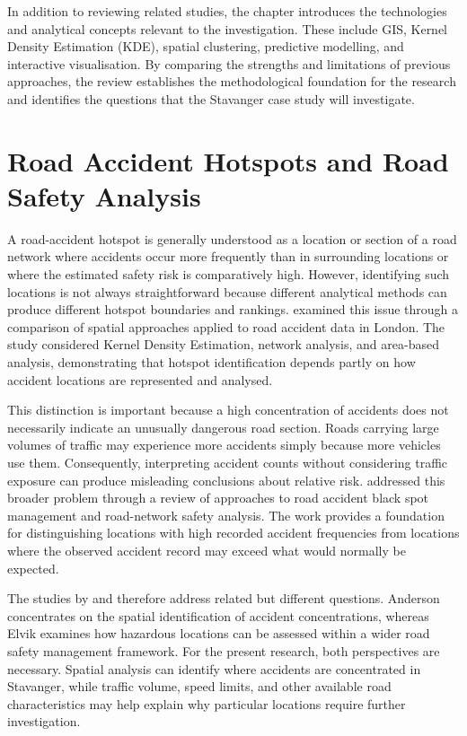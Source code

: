 In addition to reviewing related studies, the chapter introduces the technologies and analytical concepts relevant to the investigation. These include GIS, Kernel Density Estimation (KDE), spatial clustering, predictive modelling, and interactive visualisation. By comparing the strengths and limitations of previous approaches, the review establishes the methodological foundation for the research and identifies the questions that the Stavanger case study will investigate.

\section{Road Accident Hotspots and Road Safety Analysis}
\label{sec:lit-background}
A road-accident hotspot is generally understood as a location or section of a road network where accidents occur more frequently than in surrounding locations or where the estimated safety risk is comparatively high. However, identifying such locations is not always straightforward because different analytical methods can produce different hotspot boundaries and rankings. \textcite{Anderson2007} examined this issue through a comparison of spatial approaches applied to road accident data in London. The study considered Kernel Density Estimation, network analysis, and area-based analysis, demonstrating that hotspot identification depends partly on how accident locations are represented and analysed.

This distinction is important because a high concentration of accidents does not necessarily indicate an unusually dangerous road section. Roads carrying large volumes of traffic may experience more accidents simply because more vehicles use them. Consequently, interpreting accident counts without considering traffic exposure can produce misleading conclusions about relative risk. \textcite{Elvik2008} addressed this broader problem through a review of approaches to road accident black spot management and road-network safety analysis. The work provides a foundation for distinguishing locations with high recorded accident frequencies from locations where the observed accident record may exceed what would normally be expected.

The studies by \textcite{Anderson2007} and \textcite{Elvik2008} therefore address related but different questions. Anderson concentrates on the spatial identification of accident concentrations, whereas Elvik examines how hazardous locations can be assessed within a wider road safety management framework. For the present research, both perspectives are necessary. Spatial analysis can identify where accidents are concentrated in Stavanger, while traffic volume, speed limits, and other available road characteristics may help explain why particular locations require further investigation.

